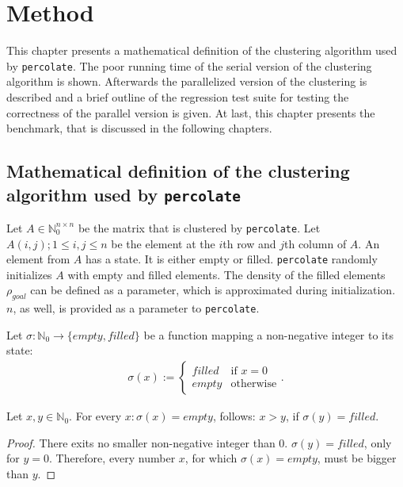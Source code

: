 \documentclass[twoside,11pt]{article}
\def\perc{\texttt{perco\-late}}
\begin{document}

\section{Method} %

This chapter presents a mathematical definition of the
clustering algorithm used by \perc{}.
The poor running time of the serial version of the
clustering algorithm is shown.
Afterwards the parallelized version of the clustering is
described and a brief outline of the regression test suite
for testing the correctness of the parallel version is
given.
At last, this chapter presents the benchmark, that is
discussed in the following chapters.


\subsection{Mathematical definition of the clustering
  algorithm used by \perc{}}

Let $A \in \mathbb{N}_0^{n \times n}$ be the matrix that
is clustered by \perc{}.
Let $A(i, j);1\leq i, j \leq n$ be the element at the
$i$th row and $j$th column of $A$.
An element from $A$ has a state. It is either empty or
filled.
\perc{} randomly initializes $A$ with empty and filled
elements.
The density of the filled elements $\rho_{goal}$ can be
defined as a parameter, which is approximated during
initialization. $n$, as well, is provided as a parameter to
\perc{}.

Let $\sigma : \mathbb{N}_0 \rightarrow \{empty,filled\}$ be
a function mapping a non-negative integer to its state:
\begin{align*}
  \sigma(x) := \begin{cases}
    filled &\text{if } x = 0 \\
    empty  &\text{otherwise}
  \end{cases}.
\end{align*}

\begin{proposition}
  \label{prop:one}
  Let $x, y \in \mathbb{N}_0$.
  For every $x: \sigma(x) = empty$, follows: $x > y$, if
  $\sigma(y) = filled$.
\end{proposition}

\begin{proof}
  There exits no smaller non-negative integer than $0$.
  $\sigma(y) = filled$, only for $y = 0$. Therefore, every
  number $x$, for which $\sigma(x) = empty$, must be bigger
  than $y$.
\end{proof}
\end{document}
